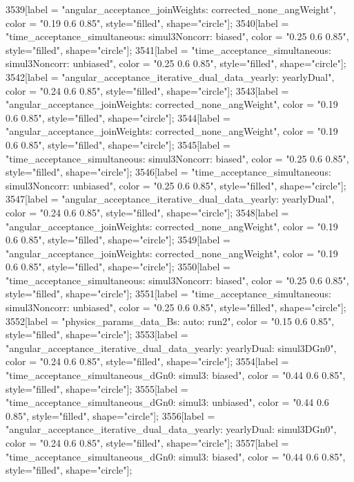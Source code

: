 {	3539[label = "angular_acceptance_joinWeights\nwflag: corrected_none_angWeight", color = "0.19 0.6 0.85", style="filled", shape="circle"];
	3540[label = "time_acceptance_simultaneous\ntimeacc: simul3Noncorr\ntrigger: biased", color = "0.25 0.6 0.85", style="filled", shape="circle"];
	3541[label = "time_acceptance_simultaneous\ntimeacc: simul3Noncorr\ntrigger: unbiased", color = "0.25 0.6 0.85", style="filled", shape="circle"];
	3542[label = "angular_acceptance_iterative_dual_data_yearly\nangacc: yearlyDual", color = "0.24 0.6 0.85", style="filled", shape="circle"];
	3543[label = "angular_acceptance_joinWeights\nwflag: corrected_none_angWeight", color = "0.19 0.6 0.85", style="filled", shape="circle"];
	3544[label = "angular_acceptance_joinWeights\nwflag: corrected_none_angWeight", color = "0.19 0.6 0.85", style="filled", shape="circle"];
	3545[label = "time_acceptance_simultaneous\ntimeacc: simul3Noncorr\ntrigger: biased", color = "0.25 0.6 0.85", style="filled", shape="circle"];
	3546[label = "time_acceptance_simultaneous\ntimeacc: simul3Noncorr\ntrigger: unbiased", color = "0.25 0.6 0.85", style="filled", shape="circle"];
	3547[label = "angular_acceptance_iterative_dual_data_yearly\nangacc: yearlyDual", color = "0.24 0.6 0.85", style="filled", shape="circle"];
	3548[label = "angular_acceptance_joinWeights\nwflag: corrected_none_angWeight", color = "0.19 0.6 0.85", style="filled", shape="circle"];
	3549[label = "angular_acceptance_joinWeights\nwflag: corrected_none_angWeight", color = "0.19 0.6 0.85", style="filled", shape="circle"];
	3550[label = "time_acceptance_simultaneous\ntimeacc: simul3Noncorr\ntrigger: biased", color = "0.25 0.6 0.85", style="filled", shape="circle"];
	3551[label = "time_acceptance_simultaneous\ntimeacc: simul3Noncorr\ntrigger: unbiased", color = "0.25 0.6 0.85", style="filled", shape="circle"];
	3552[label = "physics_params_data_Bs\nfit: auto\nyear: run2", color = "0.15 0.6 0.85", style="filled", shape="circle"];
	3553[label = "angular_acceptance_iterative_dual_data_yearly\nangacc: yearlyDual\ntimeacc: simul3DGn0", color = "0.24 0.6 0.85", style="filled", shape="circle"];
	3554[label = "time_acceptance_simultaneous_dGn0\ntimeacc: simul3\ntrigger: biased", color = "0.44 0.6 0.85", style="filled", shape="circle"];
	3555[label = "time_acceptance_simultaneous_dGn0\ntimeacc: simul3\ntrigger: unbiased", color = "0.44 0.6 0.85", style="filled", shape="circle"];
	3556[label = "angular_acceptance_iterative_dual_data_yearly\nangacc: yearlyDual\ntimeacc: simul3DGn0", color = "0.24 0.6 0.85", style="filled", shape="circle"];
	3557[label = "time_acceptance_simultaneous_dGn0\ntimeacc: simul3\ntrigger: biased", color = "0.44 0.6 0.85", style="filled", shape="circle"];
}
